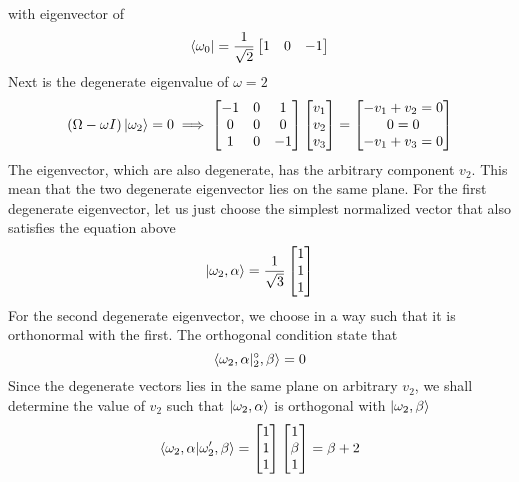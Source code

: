 \documentclass[../main.tex]{subfiles}
\begin{document}
with eigenvector of
\begin{equation*}
	\bra{\omega_0}=\frac{1}{\sqrt{2}}
	\begin{bmatrix}
		1 & 0 & -1
	\end{bmatrix}
\end{equation*}
Next is the degenerate eigenvalue of $\omega=2$
\begin{equation*}
	(\Omega-\omega I)\ket{\omega_2}=0\implies
	\begin{bmatrix}
		-1 & 0 & 1  \\
		0  & 0 & 0  \\
		1  & 0 & -1 \\
	\end{bmatrix}
	\begin{bmatrix}
		v_1 \\
		v_2 \\
		v_3 \\
	\end{bmatrix}
	=
	\begin{bmatrix}
		-v_1+v_2=0 \\
		0=0        \\
		-v_1+v_3=0 \\
	\end{bmatrix}
\end{equation*}
The eigenvector, which are also degenerate, has the arbitrary component $v_2$.
This mean that the two degenerate eigenvector lies on the same plane.
For the first degenerate eigenvector, let us just choose the simplest normalized vector that also satisfies the equation above
\begin{equation*}
	\ket{\omega_2,\alpha}=\frac{1}{\sqrt{3}}
	\begin{bmatrix}
		1 \\
		1 \\
		1 \\
	\end{bmatrix}
\end{equation*}
For the second degenerate eigenvector, we choose in a way such that it is orthonormal with the first.
The orthogonal condition state that
\begin{equation*}
	\braket{\omega_2,\alpha|^\circ_2, \beta}=0
\end{equation*}
Since the degenerate vectors lies in the same plane on arbitrary $v_2$, we shall determine the value of $v_2$ such that $\ket{\omega_2,\alpha}$ is orthogonal with $\ket{\omega_2,\beta}$
\begin{equation*}
	\braket{\omega_2,\alpha|\omega_2', \beta}=
	\begin{bmatrix}
		1 \\1\\1
	\end{bmatrix}
	\begin{bmatrix}
		1     \\
		\beta \\
		1     \\
	\end{bmatrix}
	=\beta+2
\end{equation*}
\end{document}
